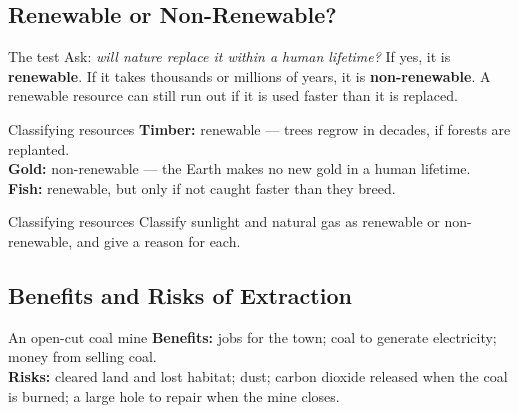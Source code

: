 \rcreset
{}

\label{theory:3}

\subsection{Renewable or Non-Renewable?}\label{sub:3.1}

\begin{skillbox}{The test}
Ask: \emph{will nature replace it within a human lifetime?} If yes, it is \textbf{renewable}. If it takes thousands or millions of years, it is \textbf{non-renewable}. A renewable resource can still run out if it is used faster than it is replaced.
\end{skillbox}

\begin{workedex}{Classifying resources}
\textbf{Timber:} renewable --- trees regrow in decades, if forests are replanted.\\
\textbf{Gold:} non-renewable --- the Earth makes no new gold in a human lifetime.\\
\textbf{Fish:} renewable, but only if not caught faster than they breed.
\end{workedex}

\begin{wedo}{Classifying resources}
Classify sunlight and natural gas as renewable or non-renewable, and give a reason for each.
\answerbox{4cm}
\end{wedo}

\subsection{Benefits and Risks of Extraction}\label{sub:3.2}

\begin{workedex}{An open-cut coal mine}
\textbf{Benefits:} jobs for the town; coal to generate electricity; money from selling coal.\\
\textbf{Risks:} cleared land and lost habitat; dust; carbon dioxide released when the coal is burned; a large hole to repair when the mine closes.
\end{workedex}

